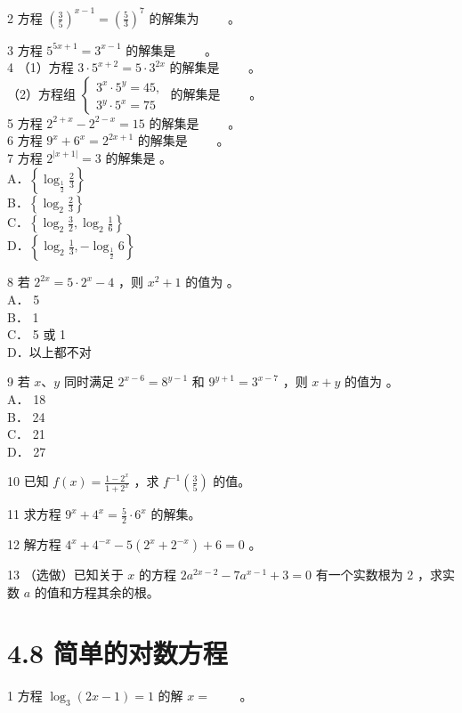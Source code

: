 \documentclass[10pt]{article}
\begin{document}
2 方程 \(\left(\frac{3}{5}\right)^{x-1}=\left(\frac{5}{3}\right)^{7}\) 的解集为 \(\qquad\)。

3 方程 \(5^{5 x+1}=3^{x-1}\) 的解集是 \(\qquad\)。\\
4 （1）方程 \(3 \cdot 5^{x+2}=5 \cdot 3^{2 x}\) 的解集是 \(\qquad\)。\\
（2）方程组 \(\left\{\begin{array}{l}3^{x} \cdot 5^{y}=45, \\ 3^{y} \cdot 5^{x}=75\end{array}\right.\) 的解集是 \(\qquad\)。\\
5 方程 \(2^{2+x}-2^{2-x}=15\) 的解集是 \(\qquad\)。\\
6 方程 \(9^{x}+6^{x}=2^{2 x+1}\) 的解集是 \(\qquad\)。\\
7 方程 \(2^{|x+1|}=3\) 的解集是 。\\
A．\(\left\{\log _{\frac{1}{2}} \frac{2}{3}\right\}\)\\
B．\(\left\{\log _{2} \frac{2}{3}\right\}\)\\
C．\(\left\{\log _{2} \frac{3}{2}, \log _{2} \frac{1}{6}\right\}\)\\
D．\(\left\{\log _{2} \frac{1}{3},-\log _{\frac{1}{2}} 6\right\}\)

8 若 \(2^{2 x}=5 \cdot 2^{x}-4\) ，则 \(x^{2}+1\) 的值为 。\\
A． 5\\
B． 1\\
C． 5 或 1\\
D．以上都不对

9 若 \(x 、 y\) 同时满足 \(2^{x-6}=8^{y-1}\) 和 \(9^{y+1}=3^{x-7}\) ，则 \(x+y\) 的值为 。\\
A． 18\\
B． 24\\
C． 21\\
D． 27

10 已知 \(f(x)=\frac{1-2^{x}}{1+2^{x}}\) ，求 \(f^{-1}\left(\frac{3}{5}\right)\) 的值。

11 求方程 \(9^{x}+4^{x}=\frac{5}{2} \cdot 6^{x}\) 的解集。

12 解方程 \(4^{x}+4^{-x}-5\left(2^{x}+2^{-x}\right)+6=0\) 。

13 （选做）已知关于 \(x\) 的方程 \(2 a^{2 x-2}-7 a^{x-1}+3=0\) 有一个实数根为 2 ，求实数 \(a\) 的值和方程其余的根。

\section*{4.8 简单的对数方程}
1 方程 \(\log _{3}(2 x-1)=1\) 的解 \(x=\) \(\qquad\)。
\end{document}
